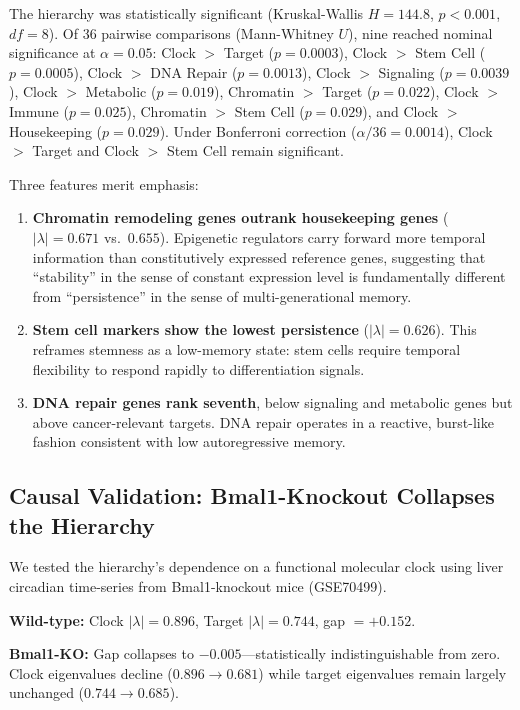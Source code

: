 \documentclass[11pt,a4paper]{article}
\begin{document}
The hierarchy was statistically significant (Kruskal-Wallis $H = 144.8$, $p < 0.001$, $df = 8$). Of 36 pairwise comparisons (Mann-Whitney $U$), nine reached nominal significance at $\alpha = 0.05$: Clock $>$ Target ($p = 0.0003$), Clock $>$ Stem Cell ($p = 0.0005$), Clock $>$ DNA Repair ($p = 0.0013$), Clock $>$ Signaling ($p = 0.0039$), Clock $>$ Metabolic ($p = 0.019$), Chromatin $>$ Target ($p = 0.022$), Clock $>$ Immune ($p = 0.025$), Chromatin $>$ Stem Cell ($p = 0.029$), and Clock $>$ Housekeeping ($p = 0.029$). Under Bonferroni correction ($\alpha/36 = 0.0014$), Clock $>$ Target and Clock $>$ Stem Cell remain significant.

Three features merit emphasis:

\begin{enumerate}[noitemsep]
    \item \textbf{Chromatin remodeling genes outrank housekeeping genes} ($|\lambda| = 0.671$ vs.\ $0.655$). Epigenetic regulators carry forward more temporal information than constitutively expressed reference genes, suggesting that ``stability'' in the sense of constant expression level is fundamentally different from ``persistence'' in the sense of multi-generational memory.

    \item \textbf{Stem cell markers show the lowest persistence} ($|\lambda| = 0.626$). This reframes stemness as a low-memory state: stem cells require temporal flexibility to respond rapidly to differentiation signals.

    \item \textbf{DNA repair genes rank seventh}, below signaling and metabolic genes but above cancer-relevant targets. DNA repair operates in a reactive, burst-like fashion consistent with low autoregressive memory.
\end{enumerate}

\subsection{Causal Validation: Bmal1-Knockout Collapses the Hierarchy}

We tested the hierarchy's dependence on a functional molecular clock using liver circadian time-series from Bmal1-knockout mice (GSE70499).

\textbf{Wild-type:} Clock $|\lambda| = 0.896$, Target $|\lambda| = 0.744$, gap $= +0.152$.

\textbf{Bmal1-KO:} Gap collapses to $-0.005$---statistically indistinguishable from zero. Clock eigenvalues decline ($0.896 \rightarrow 0.681$) while target eigenvalues remain largely unchanged ($0.744 \rightarrow 0.685$).
\end{document}

